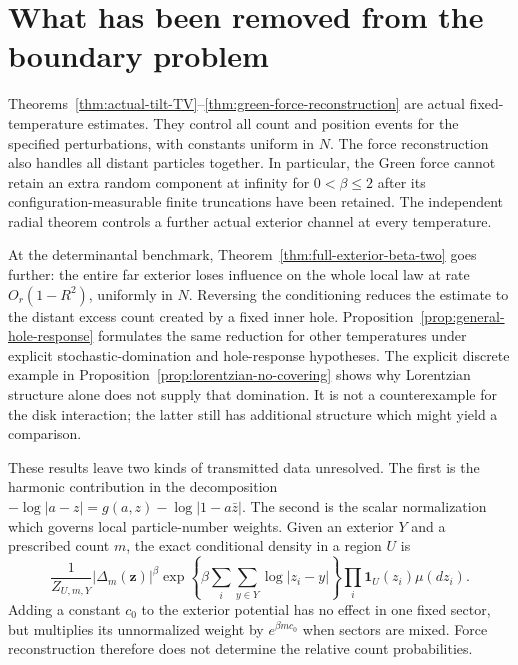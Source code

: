 \documentclass[11pt]{article}
\theoremstyle{remark}\newtheorem{remark}[theorem]{Remark}
\begin{document}
\section{What has been removed from the boundary problem}
\label{sec:remaining-boundary-problem}

Theorems~\ref{thm:actual-tilt-TV}--\ref{thm:green-force-reconstruction}
are actual fixed-temperature estimates. They control all count and
position events for the specified perturbations, with constants
uniform in $N$. The force reconstruction also handles all distant
particles together. In particular, the Green force cannot retain
an extra random component at infinity for $0<\beta\le2$ after its
configuration-measurable finite truncations have been retained.
The independent radial theorem controls a further actual exterior
channel at every temperature.

At the determinantal benchmark, Theorem~\ref{thm:full-exterior-beta-two}
goes further: the entire far exterior loses influence on the whole
local law at rate $O_r(1-R^2)$, uniformly in $N$. Reversing the
conditioning reduces the estimate to the distant excess count
created by a fixed inner hole. Proposition~\ref{prop:general-hole-response}
formulates the same reduction for other temperatures under explicit
stochastic-domination and hole-response hypotheses.
The explicit discrete example in
Proposition~\ref{prop:lorentzian-no-covering} shows why Lorentzian
structure alone does not supply that domination. It is not a
counterexample for the disk interaction; the latter still has
additional structure which might yield a comparison.

These results leave two kinds of transmitted data unresolved. The
first is the harmonic contribution in the decomposition
$-\log|a-z|=g(a,z)-\log|1-a\bar z|$. The second is the scalar
normalization which governs local particle-number weights. Given
an exterior $Y$ and a prescribed count $m$, the exact conditional
density in a region $U$ is
\[
 \frac1{Z_{U,m,Y}}|\Delta_m(\mathbf z)|^\beta
       \exp\left\{\beta\sum_i\sum_{y\in Y}\log|z_i-y|\right\}
       \prod_i\mathbf1_U(z_i)\mu(dz_i).
\]
Adding a constant $c_0$ to the exterior potential has no effect in
one fixed sector, but multiplies its unnormalized weight by
$e^{\beta m c_0}$ when sectors are mixed. Force reconstruction
therefore does not determine the relative count probabilities.
\end{document}
